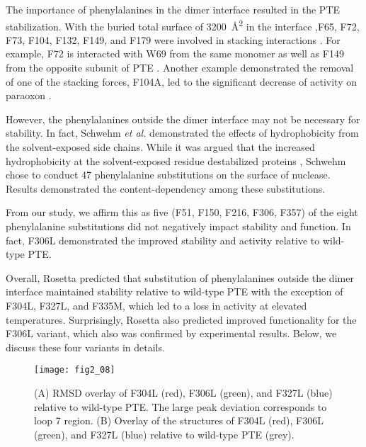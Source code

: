 \begin{refsection}
The importance of phenylalanines in the dimer interface resulted in the PTE
stabilization. With the buried total surface of \SI{3200}{\angstrom^{2}} in the
interface ,F65, F72, F73, F104, F132, F149, and F179 were involved in stacking
interactions \cite{Toone2009}. For example, F72 is interacted with W69 from the
same monomer as well as F149 from the opposite subunit of
PTE \cite{Benning2001a}. Another example demonstrated the removal of one of the
stacking forces, F104A, led to the significant decrease of activity on
paraoxon \cite{Yang2014a}.

However, the phenylalanines outside the dimer interface may not be necessary
for stability. In fact, Schwehm \emph{et al.} demonstrated the effects of
hydrophobicity from the solvent-exposed side chains. While it was argued that
the increased hydrophobicity at the solvent-exposed residue destabilized
proteins \cite{Pakula1990,Mollah2003,Herrmann1997}, Schwehm chose to conduct 47
phenylalanine substitutions on the surface of nuclease. Results demonstrated
the content-dependency among these substitutions. 

From our study, we affirm this as five (F51, F150, F216, F306, F357) of the
eight phenylalanine substitutions did not negatively impact stability and
function. In fact, F306L demonstrated the improved stability and activity
relative to wild-type PTE. 

Overall, Rosetta predicted that substitution of phenylalanines outside the
dimer interface maintained stability relative to wild-type PTE with the
exception of F304L, F327L, and F335M, which led to a loss in activity at
elevated temperatures. Surprisingly, Rosetta also predicted improved
functionality for the F306L variant, which also was confirmed by experimental
results. Below, we discuss these four variants in details.

\begin{figure}[htbp] \centering \texttt{[image: fig2\_08]}
    \caption[(A) RMSD overlay of F304L (red), F306L (green), and F327L (blue)
        relative to wild-type PTE. The large peak deviation corresponds to loop
        7 region. (B) Overlay of the structures of F304L (red),  F306L (green),
        and F327L (blue) relative to wild-type PTE (grey).] {(A) RMSD overlay
            of F304L (red), F306L (green), and F327L (blue) relative to
            wild-type PTE. The large peak deviation corresponds to loop 7
            region. (B) Overlay of the structures of F304L (red),  F306L
        (green), and F327L (blue) relative to wild-type PTE (grey).}
        \label{fig:rmsd}
\end{figure}


\end{refsection}
